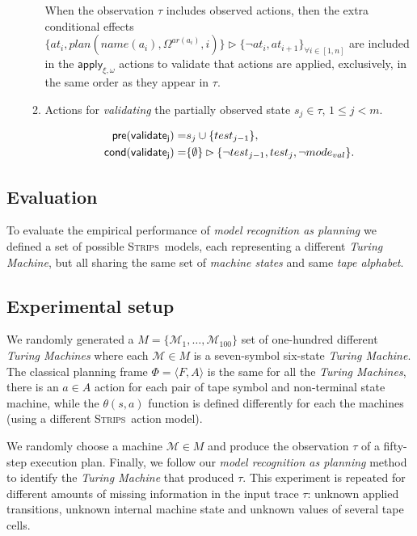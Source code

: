 \documentclass[letterpaper]{article} %
\newcommand{\tup}[1]{{\langle #1 \rangle}}
\newcommand{\pre}{\mathsf{pre}}     %
\newcommand{\cond}{\mathsf{cond}}   %
\newcommand{\strips}{\textsc{Strips}}     %
\begin{document}
\begin{itemize}
\begin{enumerate}
When the observation $\tau$ includes observed actions, then the extra conditional effects $\{at_{i},plan(name(a_i),\Omega^{ar(a_i)},i)\}\rhd\{\neg at_{i},at_{i+1}\}_{\forall i\in [1,n]}$ are included in the $\mathsf{apply_{\xi,\omega}}$ actions to validate that actions are applied, exclusively, in the same order as they appear in $\tau$.\\

\item Actions for {\em validating} the partially observed state $s_j\in\tau$, {\tt\small $1\leq j< m$}.
\begin{small}
\begin{align*}
\hspace*{7pt}\pre(\mathsf{validate_{j}})=&s_j\cup\{test_{j-1}\},\\
\cond(\mathsf{validate_{j}})=&\{\emptyset\}\rhd\{\neg test_{j-1}, test_j,\neg mode_{val}\}.
\end{align*}
\end{small}
\end{enumerate}
\end{itemize}


\subsection{Evaluation}
\label{sec:evaluation}
To evaluate the empirical performance of {\em model recognition as planning} we defined a set of possible \strips\ models, each representing a different {\em Turing Machine}, but all sharing the same set of {\em machine states} and same {\em tape alphabet}.






\subsection{Experimental setup}
We randomly generated a $M=\{\mathcal{M}_1,\ldots,\mathcal{M}_{100}\}$ set of one-hundred different {\em Turing Machines} where each $\mathcal{M}\in M$ is a seven-symbol six-state {\em Turing Machine}. The classical planning frame $\Phi=\tup{F,A}$ is the same for all the {\em Turing Machines}, there is an $a\in A$ action for each pair of tape symbol and non-terminal state machine, while the $\theta(s,a)$ function is defined differently for each the machines (using a different \strips\ action model).

We randomly choose a machine $\mathcal{M}\in M$ and produce the observation $\tau$ of a fifty-step execution plan. Finally, we follow our {\em model recognition as planning} method to identify the {\em Turing Machine} that produced $\tau$. This experiment is repeated for different amounts of missing information in the input trace $\tau$: unknown applied transitions, unknown internal machine state and unknown values of several tape cells.
\end{document}
